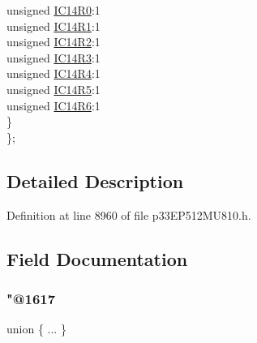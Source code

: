 \begin{DoxyCompactItemize}
\begin{tabbing}
\>\>unsigned \hyperlink{structtag_r_p_i_n_r35_b_i_t_s_a307630d6c049ed71742de6ae796b6534}{IC14R0}:1\\
\>\>unsigned \hyperlink{structtag_r_p_i_n_r35_b_i_t_s_a886dae96f67648893197f9e160a29fc9}{IC14R1}:1\\
\>\>unsigned \hyperlink{structtag_r_p_i_n_r35_b_i_t_s_a13f6735679014cff051afb6cdfe9470f}{IC14R2}:1\\
\>\>unsigned \hyperlink{structtag_r_p_i_n_r35_b_i_t_s_afaf0099b0b675c35177e21f348a4614b}{IC14R3}:1\\
\>\>unsigned \hyperlink{structtag_r_p_i_n_r35_b_i_t_s_ad6d4f4ffd13ada42b8c17517eafbbfb9}{IC14R4}:1\\
\>\>unsigned \hyperlink{structtag_r_p_i_n_r35_b_i_t_s_a835785cd585afcca698aec77d0b5e58d}{IC14R5}:1\\
\>\>unsigned \hyperlink{structtag_r_p_i_n_r35_b_i_t_s_a66d267bd8883ed4e1fdaf3c0f90beda6}{IC14R6}:1\\
\>\} \\
\}; \\

\end{tabbing}\end{DoxyCompactItemize}


\subsection{Detailed Description}


Definition at line 8960 of file p33\+E\+P512\+M\+U810.\+h.



\subsection{Field Documentation}
\mbox{\label{structtag_r_p_i_n_r35_b_i_t_s_a8f075a29ada0f2828980e1374b3227a6}} 
\subsubsection{\texorpdfstring{"@1617}{@1617}}
{\footnotesize\ttfamily union \{ ... \} }

\mbox{\label{structtag_r_p_i_n_r35_b_i_t_s_adf71f3d8410c1f1dbbc96680a92c49af}} 
